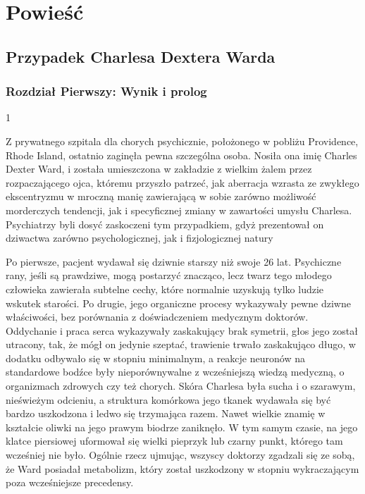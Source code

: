 \part{Powieść}

\chapter{Przypadek Charlesa Dextera Warda}


\section{Rozdział Pierwszy: Wynik i prolog}

\begin{center}
1
\end{center}

Z prywatnego szpitala dla chorych psychicznie, położonego w pobliżu Providence, Rhode Island, ostatnio zaginęła pewna szczególna osoba. Nosiła ona imię Charles Dexter Ward, i została umieszczona w zakładzie z wielkim żalem przez rozpaczającego ojca, któremu przyszło patrzeć, jak aberracja wzrasta ze zwykłego ekscentryzmu w mroczną manię zawierającą w sobie zarówno możliwość morderczych tendencji, jak i specyficznej zmiany w zawartości umysłu Charlesa. Psychiatrzy byli dosyć zaskoczeni tym przypadkiem, gdyż prezentował on dziwactwa zarówno psychologicznej, jak i fizjologicznej natury

Po pierwsze, pacjent wydawał się dziwnie starszy niż swoje 26 lat. Psychiczne rany, jeśli są prawdziwe, mogą postarzyć znacząco, lecz twarz tego młodego człowieka zawierała subtelne cechy, które normalnie uzyskują tylko ludzie wskutek starości. Po drugie, jego organiczne procesy wykazywały pewne dziwne właściwości, bez porównania z doświadczeniem medycznym doktorów. Oddychanie i praca serca wykazywały zaskakujący brak symetrii, głos jego został utracony, tak, że mógł on jedynie szeptać, trawienie trwało zaskakująco długo, w dodatku odbywało się w stopniu minimalnym, a reakcje neuronów na standardowe bodźce były nieporównywalne z wcześniejszą wiedzą medyczną, o organizmach zdrowych czy też chorych. Skóra Charlesa była sucha i o szarawym, nieświeżym odcieniu, a struktura komórkowa jego tkanek wydawała się być bardzo uszkodzona i ledwo się trzymająca razem. Nawet wielkie znamię w kształcie oliwki na jego prawym biodrze zaniknęło. W tym samym czasie, na jego klatce piersiowej uformował się wielki pieprzyk lub czarny punkt, którego tam wcześniej nie było. Ogólnie rzecz ujmując, wszyscy doktorzy zgadzali się ze sobą, że Ward posiadał metabolizm, który został uszkodzony w stopniu wykraczającym poza wcześniejsze precedensy.

